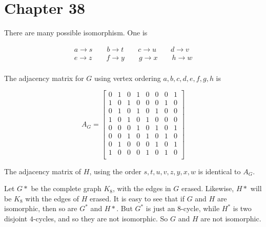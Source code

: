    \section*{Chapter 38}
    
\begin{Solution}{38.1}
There are many possible isomorphism. One is

\begin{gather*}
a\to s\qquad b\to t\qquad c\to u\qquad d\to v\\
e\to z\qquad f\to y\qquad g\to x\qquad h\to w\\
\end{gather*}

The adjacency matrix for $G$ using vertex ordering $a,b,c,d,e,f,g,h$ is

\[
A_G =
{\begin{bmatrix}
0 & 1 & 0 & 1 & 0 & 0 & 0 & 1 \\
1 & 0 & 1 & 0 & 0 & 0 & 1 & 0 \\
0 & 1 & 0 & 1 & 0 & 1 & 0 & 0 \\
1 & 0 & 1 & 0 & 1 & 0 & 0 & 0 \\
0 & 0 & 0 & 1 & 0 & 1 & 0 & 1 \\
0 & 0 & 1 & 0 & 1 & 0 & 1 & 0 \\
0 & 1 & 0 & 0 & 0 & 1 & 0 & 1 \\
1 & 0 & 0 & 0 & 1 & 0 & 1 & 0 \\
\end{bmatrix}}
\]

The adjacency matrix of $H$, using the order $s,t,u,v,z,y,x,w$ is identical to $A_G$.
\end{Solution}

    
\begin{Solution}{38.2}
Let $G*$ be the complete graph $K_8$, with the edges in $G$ erased. Likewise, $H*$ will be $K_8$ with the edges of $H$ erased. It is easy to see that if $G$ and $H$ are isomorphic, then so are $G^*$ and $H*$. But
$G^*$ is just an $8${-}cycle, while $H^*$ is two disjoint $4${-}cycles, and so they are not isomorphic. So $G$ and $H$ are not isomorphic.

\end{Solution}

